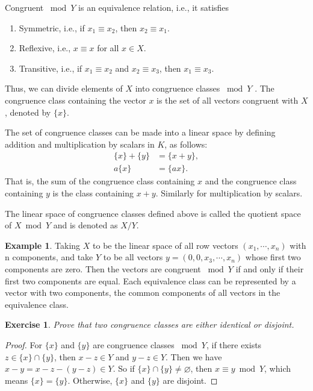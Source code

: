 \documentclass[11pt]{book}
\newtheorem{exercise}{Exercise}[section]
\theoremstyle{definition}
\newtheorem{example}{Example}[chapter]
\numberwithin{equation}{chapter}
\begin{document}
Congruent $\bmod Y$ is an equivalence relation, i.e., it satisfies
\begin{enumerate}[label=(\arabic*)]
    \item Symmetric, i.e., if $x_1\equiv x_2$, then $x_2\equiv x_1$.
    \item Reflexive, i.e., $x\equiv x$ for all $x\in X$.
    \item Transitive, i.e., if $x_1\equiv x_2$ and $x_2\equiv x_3$, then $x_1\equiv x_3$.
\end{enumerate}
Thus, we can divide elements of $X$ into congruence classes $\bmod Y$ . The congruence class containing the vector $x$ is the set of all vectors congruent with $X$, denoted by $\{x\}$.

The set of congruence classes can be made into a linear space by defining addition and multiplication by scalars in $K$, as follows:
\begin{align*}
    \{x\} + \{y\}& = \{x+y\},\\
    a\{x\} &= \{ax\}.
\end{align*}
That is, the sum of the congruence class containing $x$ and the congruence class containing $y$ is the class containing $x + y$. Similarly for multiplication by scalars.

The linear space of congruence classes defined above is called the quotient space of $X \bmod Y$ and is denoted as $X/Y$. 

\medskip

\begin{example}
Taking $X$ to be the linear space of all row vectors $(x_1,\cdots, x_n)$ with n components, and take $Y$ to be all vectors $y = (0, 0, x_3,\cdots, x_n) $ whose first two components are zero. Then the vectors are congruent $\bmod Y$ if and only if their first two components are equal. Each equivalence class can be represented by a vector with two components, the common components of all vectors in the equivalence class. 
\end{example}

\medskip

\begin{exercise}
Prove that two congruence classes are either identical or disjoint. 
\end{exercise}
\begin{proof}
For $\{x\}$ and $\{y\}$ are congruence classes $\bmod Y$, if there exists $z\in \{x\}\cap \{y\}$, then $x-z \in Y$ and $y-z\in Y$. Then we have $x-y = x-z-(y-z) \in Y$. So if $\{x\}\cap \{y\}\neq \varnothing$, then $x\equiv y \bmod Y$, which means $\{x\} = \{y\}$. Otherwise, $\{x\}$ and $\{y\}$ are disjoint.
\end{proof}
\end{document}
